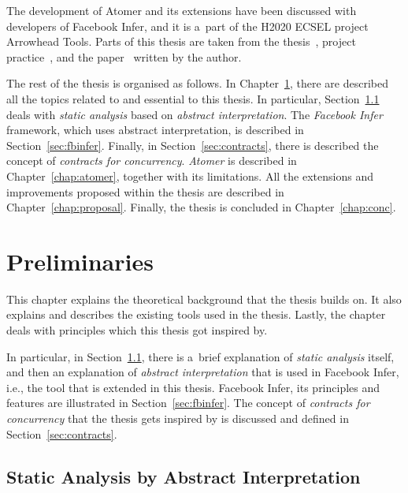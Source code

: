 The development of Atomer and its extensions have been discussed with
developers of Facebook Infer, and it is a~part of the H2020 ECSEL project
Arrowhead Tools. Parts of this thesis are taken from the
thesis~\cite{harmimBP}, project practice~\cite{ppHarmim2020}, and the
paper~\cite{excel2019FBInfer} written by the author.

The rest of the thesis is organised as follows. In Chapter~\ref{chap:prelim},
there are described all the topics related to and essential to this thesis.
In particular, Section~\ref{sec:statAnalysisAI} deals with \emph{static
analysis} based on \emph{abstract interpretation}. The \emph{Facebook Infer}
framework, which uses abstract interpretation, is described in
Section~\ref{sec:fbinfer}. Finally, in Section~\ref{sec:contracts}, there
is described the concept of \emph{contracts for concurrency}. \emph{Atomer}
is described in Chapter~\ref{chap:atomer}, together with its limitations.
All the extensions and improvements proposed within the thesis are described
in Chapter~\ref{chap:proposal}. Finally, the thesis is concluded in
Chapter~\ref{chap:conc}.



\chapter{Preliminaries}
\label{chap:prelim}


This chapter explains the theoretical background that the thesis builds
on. It also explains and describes the existing tools used in the
thesis. Lastly, the chapter deals with principles which this thesis
got inspired by.

In particular, in Section~\ref{sec:statAnalysisAI}, there is a~brief
explanation of \emph{static analysis} itself, and then an explanation of
\emph{abstract interpretation} that is used in Facebook Infer, i.e., the
tool that is extended in this thesis. Facebook Infer, its principles and
features are illustrated in Section~\ref{sec:fbinfer}. The concept of
\emph{contracts for concurrency} that the thesis gets inspired by is
discussed and defined in Section~\ref{sec:contracts}.


\section{Static Analysis by Abstract Interpretation}
\label{sec:statAnalysisAI}

